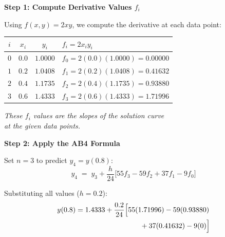 \documentclass[12pt]{beamer}
\begin{document}
\begin{frame}{\textbf{Step 1: Compute Derivative Values $f_i$}}
  \begin{center}
    \vfill
    Using $f(x, y) = 2xy$, we compute the derivative at each data point:

    \vspace{1.5em}
    \begin{tabular}{cccl}
      \toprule
      $i$ & $x_i$ & $y_i$ & $f_i = 2 x_i y_i$ \\
      \midrule
      $0$ & $0.0$ & $1.0000$ & $f_0 = 2(0.0)(1.0000) = \mathbf{0.00000}$ \\[0.3em]
      $1$ & $0.2$ & $1.0408$ & $f_1 = 2(0.2)(1.0408) = \mathbf{0.41632}$ \\[0.3em]
      $2$ & $0.4$ & $1.1735$ & $f_2 = 2(0.4)(1.1735) = \mathbf{0.93880}$ \\[0.3em]
      $3$ & $0.6$ & $1.4333$ & $f_3 = 2(0.6)(1.4333) = \mathbf{1.71996}$ \\
      \bottomrule
    \end{tabular}

    \vspace{1.5em}
    \textit{These $f_i$ values are the slopes of the solution curve\\
    at the given data points.}
    \vfill
  \end{center}
\end{frame}

\begin{frame}{\textbf{Step 2: Apply the AB4 Formula}}
  \begin{center}
    \vfill
    Set $n = 3$ to predict $y_4 = y(0.8)$:
    \[
      y_4 \;=\; y_3 + \frac{h}{24}\bigl[55f_3 - 59f_2 + 37f_1 - 9f_0\bigr]
    \]

    \vspace{1em}
    Substituting all values ($h = 0.2$):
    \begin{align*}
      y(0.8) &= 1.4333 + \frac{0.2}{24}\Bigl[55(1.71996) - 59(0.93880)\\
             &\qquad\qquad\qquad\qquad\quad + 37(0.41632) - 9(0)\Bigr]
    \end{align*}
    \vfill
  \end{center}
\end{frame}
\end{document}
